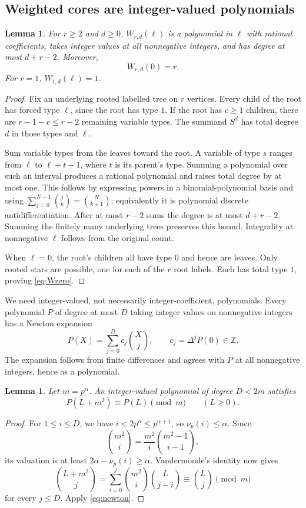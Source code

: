 \documentclass[11pt,letterpaper]{article}
\newtheorem{lemma}[theorem]{Lemma}
\theoremstyle{definition}
\theoremstyle{remark}
\newcommand{\Z}{\mathbb Z}
\begin{document}
\subsection{Weighted cores are integer-valued polynomials}
\begin{lemma}\label{lem:polynomial}
For $r\ge2$ and $d\ge0$, $W_{r,d}(\ell)$ is a polynomial in $\ell$ with
rational coefficients, takes integer values at all nonnegative integers,
and has degree at most $d+r-2$. Moreover,
\begin{equation}\label{eq:Wzero}
 W_{r,d}(0)=r.
\end{equation}
For $r=1$, $W_{1,d}(\ell)=1$.
\end{lemma}
\begin{proof}
Fix an underlying rooted labelled tree on $r$ vertices. Every child of
the root has forced type $\ell$, since the root has type $1$.
If the root has $c\ge1$ children, there are $r-1-c\le r-2$ remaining
variable types. The summand $S^d$ has total degree $d$ in those types and
$\ell$.

Sum variable types from the leaves toward the root. A variable of type
$s$ ranges from $\ell$ to $\ell+t-1$, where $t$ is its parent's type.
Summing a polynomial over such an interval produces a rational
polynomial and raises total degree by at most one. This follows by
expressing powers in a binomial-polynomial basis and using
$\sum_{j=0}^{N-1}\binom jk=\binom N{k+1}$; equivalently it is polynomial
discrete antidifferentiation. After at most $r-2$ sums the degree is at
most $d+r-2$. Summing the finitely many underlying trees preserves this
bound. Integrality at nonnegative $\ell$ follows from the original count.

When $\ell=0$, the root's children all have type $0$ and hence are
leaves. Only rooted stars are possible, one for each of the $r$ root
labels. Each has total type $1$, proving \eqref{eq:Wzero}.
\end{proof}

We need integer-valued, not necessarily integer-coefficient, polynomials.
Every polynomial $P$ of degree at most $D$ taking integer values on
nonnegative integers has a Newton expansion
\begin{equation}\label{eq:newton}
 P(X)=\sum_{j=0}^D c_j\binom Xj,\qquad
 c_j=\Delta^jP(0)\in\Z.
\end{equation}
The expansion follows from finite differences and agrees with $P$ at
all nonnegative integers, hence as a polynomial.

\begin{lemma}\label{lem:newtonperiod}
Let $m=p^\alpha$. An integer-valued polynomial of degree $D<2m$ satisfies
\[
 P(L+m^2)\equiv P(L)\pmod m\qquad(L\ge0).
\]
\end{lemma}
\begin{proof}
For $1\le i\le D$, we have $i<2p^\alpha\le p^{\alpha+1}$, so
$\nu_p(i)\le\alpha$. Since
\[
 \binom{m^2}{i}=\frac{m^2}{i}\binom{m^2-1}{i-1},
\]
its valuation is at least $2\alpha-\nu_p(i)\ge\alpha$.
Vandermonde's identity now gives
\[
 \binom{L+m^2}{j}
 =\sum_{i=0}^j\binom{m^2}{i}\binom L{j-i}
 \equiv\binom Lj\pmod m
\]
for every $j\le D$. Apply \eqref{eq:newton}.
\end{proof}
\end{document}
